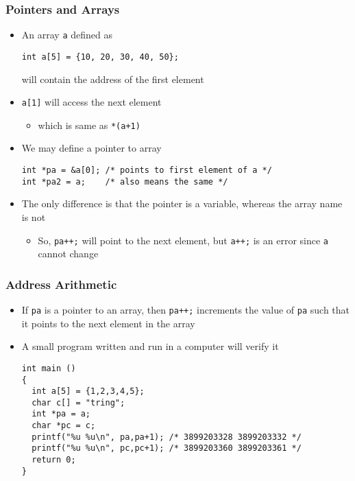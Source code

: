 \documentclass[11pt]{beamer}
\begin{document}
\begin{frame}[fragile]\frametitle{Pointers and Arrays}
\label{sec-1-5}

\begin{itemize}
\item An array \verb~a~ defined as

\begin{verbatim}
int a[5] = {10, 20, 30, 40, 50};
\end{verbatim}
  will contain the address of the first element
\item \verb~a[1]~ will access the next element
\begin{itemize}
\item which is same as \verb~*(a+1)~
\end{itemize}
\item We may define a pointer to array 

\begin{verbatim}
int *pa = &a[0]; /* points to first element of a */
int *pa2 = a;    /* also means the same */
\end{verbatim}
\item The only difference is that the pointer is a variable, whereas the array name is not
\begin{itemize}
\item So, \verb~pa++;~ will point to the next element, but \verb~a++;~ is an error since \verb~a~ cannot change
\end{itemize}
\end{itemize}
\end{frame}
\begin{frame}[fragile]\frametitle{Address Arithmetic}
\label{sec-1-6}

\begin{itemize}
\item If \verb~pa~ is a pointer to an array, then \verb~pa++;~ increments the value of \verb~pa~ such that it points to the next element in the array
\item A small program written and run in a computer will verify it

\begin{verbatim}
int main ()
{
  int a[5] = {1,2,3,4,5};
  char c[] = "tring";
  int *pa = a;
  char *pc = c;
  printf("%u %u\n", pa,pa+1); /* 3899203328 3899203332 */
  printf("%u %u\n", pc,pc+1); /* 3899203360 3899203361 */
  return 0;
}
\end{verbatim}
\end{itemize}
\end{frame}
\end{document}
